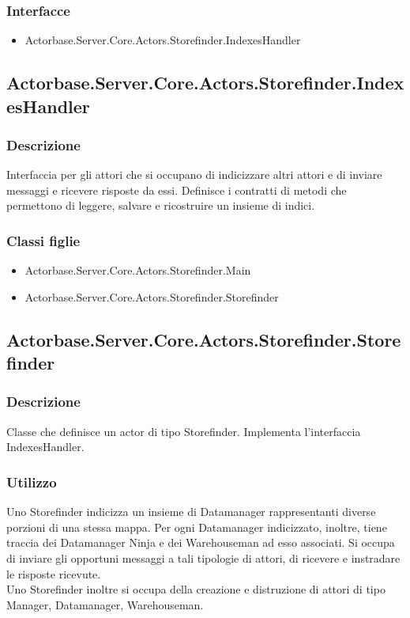 \documentclass[a4paper]{article}
\begin{document}
			\subsubsection{Interfacce}
			\begin{itemize}
				\item Actorbase.Server.Core.Actors.Storefinder.IndexesHandler
			\end{itemize}

		\subsection{Actorbase.Server.Core.Actors.Storefinder.IndexesHandler}
			\subsubsection{Descrizione}
				Interfaccia per gli attori che si occupano di indicizzare altri attori e di inviare messaggi e ricevere risposte da essi. Definisce i contratti di metodi che permettono di leggere, salvare e ricostruire un insieme di indici.
			\subsubsection{Classi figlie}
			\begin{itemize}
				\item Actorbase.Server.Core.Actors.Storefinder.Main
				\item Actorbase.Server.Core.Actors.Storefinder.Storefinder
			\end{itemize}

		\subsection{Actorbase.Server.Core.Actors.Storefinder.Storefinder}
			\subsubsection{Descrizione}
				Classe che definisce un actor di tipo Storefinder. Implementa l'interfaccia IndexesHandler.
			\subsubsection{Utilizzo}
				Uno Storefinder indicizza un insieme di Datamanager rappresentanti diverse porzioni di una stessa mappa. Per ogni Datamanager indicizzato, inoltre, tiene traccia dei Datamanager Ninja e dei Warehouseman ad esso associati. Si occupa di inviare gli opportuni messaggi a tali tipologie di attori, di ricevere e instradare le risposte ricevute. 
				\\ Uno Storefinder inoltre si occupa della creazione e distruzione di attori di tipo Manager, Datamanager, Warehouseman.
\end{document}
